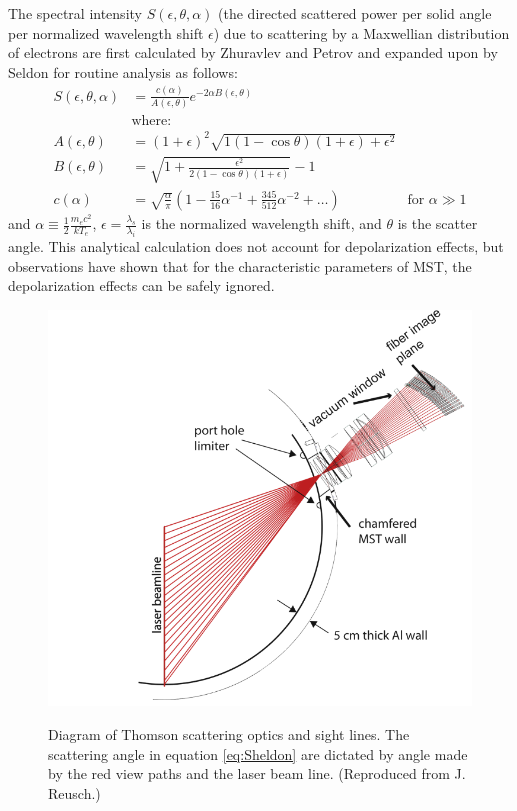 The spectral intensity $S(\epsilon, \theta, \alpha)$ (the directed scattered power per solid angle per normalized  wavelength shift $\epsilon$) due to scattering by a Maxwellian distribution of electrons are first calculated by Zhuravlev and Petrov\cite{Zhuravlev1979} and expanded upon by Seldon\cite{Seldon1982} for routine analysis as follows:
\begin{align}
    S(\epsilon, \theta, \alpha) &= \frac{c(\alpha)}{A(\epsilon, \theta)}e^{-2\alpha B(\epsilon,\theta)} \label{eq:Sheldon}\\
    &\text{where:}\nonumber\\
    A (\epsilon, \theta) &= (1+\epsilon)^2\sqrt{1(1- \cos\theta)(1+\epsilon) + \epsilon^2} \nonumber\\
    B (\epsilon, \theta) &= \sqrt{1 + \frac{\epsilon^2}{2(1-\cos\theta)(1+\epsilon)}} - 1 \nonumber\\
    c (\alpha) &= \sqrt{\frac{\alpha}{\pi}}(1 - \frac{15}{16}\alpha^{-1} + \frac{345}{512}\alpha^{-2} + \ldots) &\text{for } \alpha \gg 1 \nonumber
\end{align}
and $\alpha \equiv \frac{1}{2}\frac{m_ec^2}{kT_e}$, $\epsilon = \frac{\lambda_s}{\lambda_i}$ is the normalized wavelength shift, and $\theta$ is the scatter angle. This analytical calculation does not account for depolarization effects, but observations have shown that for the characteristic parameters of MST, the depolarization effects can be safely ignored\cite{Seldon1982}. 

\begin{figure}[!htb]
	\centering
	\includegraphics[width = 0.9\linewidth]{./implementation/diagnostics/ts_optics_diagram.png}
	\label{fig:ts_optics_diagram}
	\caption[Diagram of Thomson scattering optics and sight lines]{Diagram of Thomson scattering optics and sight lines. The scattering angle in equation \ref{eq:Sheldon} are dictated by angle made by the red view paths and the laser beam line. (Reproduced from J. Reusch.\cite{Reusch2011})}
\end{figure}

